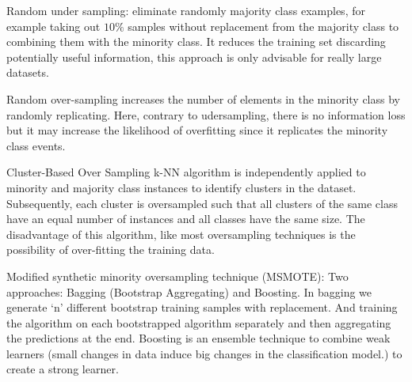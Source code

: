 \documentclass[11pt]{article}
\theoremstyle{definition}
\theoremstyle{remark}
\begin{document}
Random under sampling: eliminate randomly majority class examples, for example taking out $10\%$ samples without replacement from the majority class to combining them with the minority class. It reduces the training set discarding potentially useful information, this approach is only advisable for really large datasets.

Random over-sampling increases the number of elements in the minority class by randomly replicating. Here, contrary to udersampling, there is no information loss but it may increase the likelihood of overfitting since it replicates the minority class events.

Cluster-Based Over Sampling k-NN algorithm is independently applied to minority and majority class instances to identify clusters in the dataset. Subsequently, each cluster is oversampled such that all clusters of the same class have an equal number of instances and all classes have the same size. The disadvantage of this algorithm, like most oversampling techniques is the possibility of over-fitting the training data.  

Modified synthetic minority oversampling technique (MSMOTE): Two approaches: Bagging (Bootstrap Aggregating) and Boosting. In bagging we generate ‘n’ different bootstrap training samples with replacement. And training the algorithm on each bootstrapped algorithm separately and then aggregating the predictions at the end. 
Boosting is an ensemble technique to combine weak learners (small changes in data induce big changes in the classification model.) to create a strong learner. 

\newpage





\end{document}
